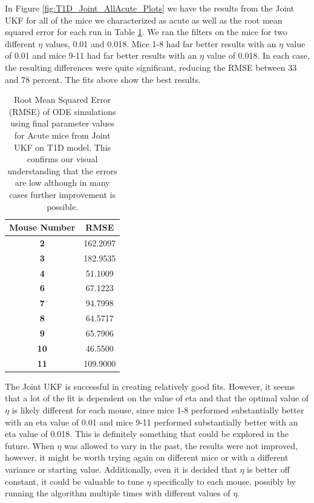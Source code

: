 In Figure \ref{fig:T1D_Joint_AllAcute_Plots} we have the results from the Joint UKF for all of the mice we characterized as acute as well as the root mean squared error for each run in Table \ref{table:T1D_Joint_AllAcute_RMSE}. We ran the filters on the mice for two different $\eta$ values, 0.01 and 0.018. Mice 1-8 had far better results with an $\eta$ value of  0.01 and mice 9-11 had far better results  with an $\eta$ value of 0.018. In each case, the resulting differences were quite significant, reducing the RMSE between 33 and 78 percent. The fits above show the best results.

\begin{table}[H]
  \begin{center}

    \begin{tabular}{c|c} %
      \textbf{Mouse Number} & \textbf{RMSE} \\
      \hline
      \textbf{2} &  162.2097\\
      \textbf{3} & 182.9535\\
      \textbf{4} & 51.1009\\
      \textbf{6} & 67.1223\\
      \textbf{7} & 94.7998\\
      \textbf{8} & 64.5717\\
      \textbf{9} & 65.7906\\
      \textbf{10} & 46.5500\\
      \textbf{11} & 109.9000
    \end{tabular}
    \caption{Root Mean Squared Error (RMSE) of ODE simulations using final parameter values for Acute mice from Joint UKF on T1D model. This confirms our visual understanding that the errors are low although in many cases further improvement is possible.}
    \label{table:T1D_Joint_AllAcute_RMSE}
  \end{center}
\end{table}

The Joint UKF is successful in creating relatively good fits. However, it seems that a lot of the fit is dependent on the value of eta and that the optimal value of $\eta$ is likely different for each mouse, since mice 1-8 performed substantially better with an eta value of 0.01 and mice 9-11 performed substantially better with an eta value of 0.018. This is definitely something that could be explored in the future. When $\eta$ was allowed to vary in the past, the results were not improved, however, it might be worth trying again on different mice or with a different variance or starting value. Additionally, even it is decided that $\eta$ is better off constant, it could be valuable to tune $\eta$ specifically to each mouse, possibly by running the algorithm multiple times with different values of $\eta$.

